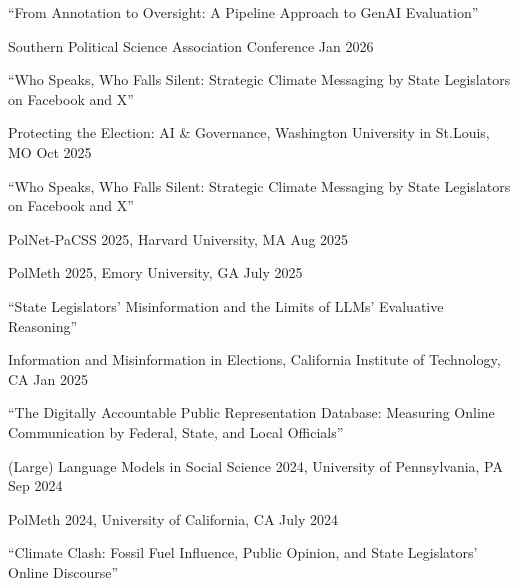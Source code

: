 \documentclass[10.5pt,]{article}
\providecommand{\tightlist}{%
	\setlength{\itemsep}{0pt}\setlength{\parskip}{0pt}}
\renewenvironment{itemize}{
	\begin{list}{}{
			\setlength{\leftmargin}{1.5em}
		}
	}{
	\end{list}
}
\begin{document}
\begin{itemize}
\tightlist
\item
  ``From Annotation to Oversight: A Pipeline Approach to GenAI
  Evaluation''

  \begin{itemize}
  \tightlist
  \item
    Southern Political Science Association Conference \hfill Jan 2026
  \end{itemize}
\item
  ``Who Speaks, Who Falls Silent: Strategic Climate Messaging by State
  Legislators on Facebook and X''

  \begin{itemize}
  \tightlist
  \item
    Protecting the Election: AI \& Governance, Washington University in
    St.Louis, MO \hfill  Oct 2025
  \end{itemize}
\item
  ``Who Speaks, Who Falls Silent: Strategic Climate Messaging by State
  Legislators on Facebook and X''

  \begin{itemize}
  \tightlist
  \item
    PolNet-PaCSS 2025, Harvard University, MA \hfill Aug 2025
  \item
    PolMeth 2025, Emory University, GA \hfill July 2025
  \end{itemize}
\item
  ``State Legislators' Misinformation and the Limits of LLMs' Evaluative
  Reasoning''

  \begin{itemize}
  \tightlist
  \item
    Information and Misinformation in Elections, California Institute of
    Technology, CA \hfill Jan 2025
  \end{itemize}
\item
  ``The Digitally Accountable Public Representation Database: Measuring
  Online Communication by Federal, State, and Local Oﬀicials''

  \begin{itemize}
  \tightlist
  \item
    (Large) Language Models in Social Science 2024, University of
    Pennsylvania, PA \hfill Sep 2024
  \item
    PolMeth 2024, University of California, CA \hfill July 2024
  \end{itemize}
\item
  ``Climate Clash: Fossil Fuel Influence, Public Opinion, and State
  Legislators' Online Discourse''


\end{itemize}
\end{document}
